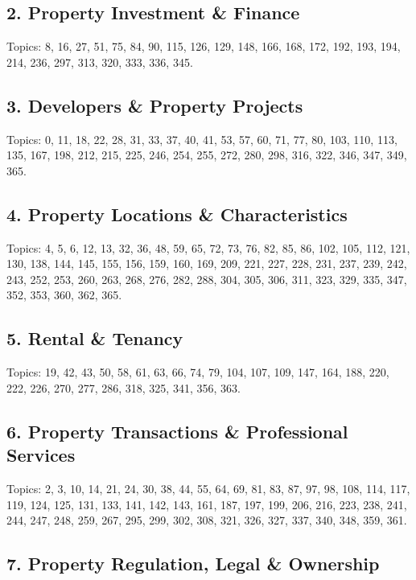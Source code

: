 \documentclass[10pt]{article}
\begin{document}
\subsection*{2. Property Investment \& Finance}

Topics: 8, 16, 27, 51, 75, 84, 90, 115, 126, 129, 148, 166, 168, 172, 192, 193, 194, 214, 236, 297, 313, 320, 333, 336, 345.

\subsection*{3. Developers \& Property Projects}

Topics: 0, 11, 18, 22, 28, 31, 33, 37, 40, 41, 53, 57, 60, 71, 77, 80, 103, 110, 113, 135, 167, 198, 212, 215, 225, 246, 254, 255, 272, 280, 298, 316, 322, 346, 347, 349, 365.

\subsection*{4. Property Locations \& Characteristics}

Topics: 4, 5, 6, 12, 13, 32, 36, 48, 59, 65, 72, 73, 76, 82, 85, 86, 102, 105, 112, 121, 130, 138, 144, 145, 155, 156, 159, 160, 169, 209, 221, 227, 228, 231, 237, 239, 242, 243, 252, 253, 260, 263, 268, 276, 282, 288, 304, 305, 306, 311, 323, 329, 335, 347, 352, 353, 360, 362, 365.

\subsection*{5. Rental \& Tenancy}

Topics: 19, 42, 43, 50, 58, 61, 63, 66, 74, 79, 104, 107, 109, 147, 164, 188, 220, 222, 226, 270, 277, 286, 318, 325, 341, 356, 363.

\subsection*{6. Property Transactions \& Professional Services}

Topics: 2, 3, 10, 14, 21, 24, 30, 38, 44, 55, 64, 69, 81, 83, 87, 97, 98, 108, 114, 117, 119, 124, 125, 131, 133, 141, 142, 143, 161, 187, 197, 199, 206, 216, 223, 238, 241, 244, 247, 248, 259, 267, 295, 299, 302, 308, 321, 326, 327, 337, 340, 348, 359, 361.

\subsection*{7. Property Regulation, Legal \& Ownership}
\end{document}
